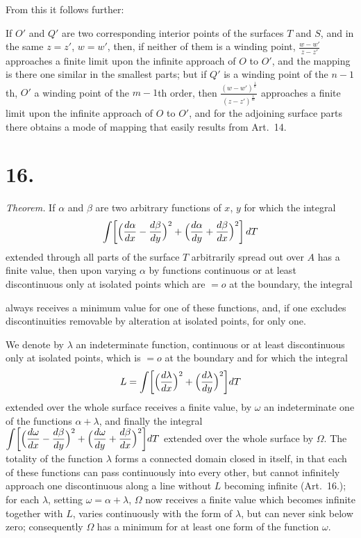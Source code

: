 \documentclass{article}
\begin{document}
From this it follows further:

If $O'$ and $Q'$ are two corresponding interior points of the surfaces $T$ and $S$, and in the same $z = z'$, $w = w'$, then, if neither of them is a winding point, $\frac{w - w'}{z - z'}$ approaches a finite limit upon the infinite approach of $O$ to $O'$, and the mapping is there one similar in the smallest parts; but if $Q'$ is a winding point of the $n-1$th, $O'$ a winding point of the $m-1$th order, then $\frac{(w - w')^{\frac{1}{n}}}{(z - z')^{\frac{1}{m}}}$ approaches a finite limit upon the infinite approach of $O$ to $O'$, and for the adjoining surface parts there obtains a mode of mapping that easily results from Art.~14.

\section*{16.}

\emph{Theorem.} If $\alpha$ and $\beta$ are two arbitrary functions of $x$, $y$ for which the integral
\[
\int \biggl[\Bigl(\frac{d\alpha}{dx} - \frac{d\beta}{dy}\Bigr)^2 + \Bigl(\frac{d\alpha}{dy} + \frac{d\beta}{dx}\Bigr)^2\biggr]\,dT
\]
extended through all parts of the surface $T$ arbitrarily spread out over $A$ has a finite value, then upon varying $\alpha$ by functions continuous or at least discontinuous only at isolated points which are $= o$ at the boundary, the integral

always receives a minimum value for one of these functions, and, if one excludes discontinuities removable by alteration at isolated points, for only one.

We denote by $\lambda$ an indeterminate function, continuous or at least discontinuous only at isolated points, which is $= o$ at the boundary and for which the integral
\[
L = \int \biggl[\Bigl(\frac{d\lambda}{dx}\Bigr)^2 + \Bigl(\frac{d\lambda}{dy}\Bigr)^2\biggr] dT
\]
extended over the whole surface receives a finite value, by $\omega$ an indeterminate one of the functions $\alpha + \lambda$, and finally the integral $\displaystyle\int \biggl[\Bigl(\frac{d\omega}{dx} - \frac{d\beta}{dy}\Bigr)^2 + \Bigl(\frac{d\omega}{dy} + \frac{d\beta}{dx}\Bigr)^2\biggr] dT$ extended over the whole surface by $\varOmega$. The totality of the function $\lambda$ forms a connected domain closed in itself, in that each of these functions can pass continuously into every other, but cannot infinitely approach one discontinuous along a line without $L$ becoming infinite (Art.~16.); for each $\lambda$, setting $\omega = \alpha + \lambda$, $\varOmega$ now receives a finite value which becomes infinite together with $L$, varies continuously with the form of $\lambda$, but can never sink below zero; consequently $\varOmega$ has a minimum for at least one form of the function $\omega$.
\end{document}
